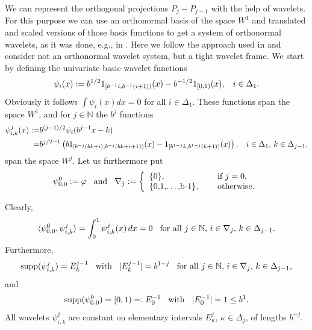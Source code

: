 \documentclass[12pt]{article}
\DeclareMathOperator{\supp}{supp}
\newcommand{\N}{\mathbb{N}}
\begin{document}
We can represent the orthogonal projections $P_j-P_{j-1}$ with the help
of wavelets. For this purpose we can use an orthonormal basis of the
space $W^1$ and translated and scaled versions of those basis functions
to get a system of orthonormal wavelets, as it was done, e.g., in
\cite{GLS07}. Here we follow the approach used in \cite{Owen97, HHY04}
and consider not an orthonormal wavelet system, but a tight
wavelet frame.
We start by defining the univariate basic wavelet functions
\begin{equation*}
\psi_i(x) := b^{1/2} 1_{[b^{-1}i, b^{-1}(i+1))}(x)
-b^{-1/2} 1_{[0,1)}(x),
\hspace{2ex}\text{$i\in\Delta_1$.}
\end{equation*}
Obviously it follows $\int \psi_i (x)dx =0$ for all $i\in\Delta_1$.
These functions span the space $W^1$, and for $j\in \N$ the $b^{j}$ functions
\begin{equation*}
\begin{split}
\psi^j_{i,k}(x) :=& b^{(j-1)/2}\psi_i(b^{j-1}x-k)\\
=& b^{j/2-1} \left( b 1_{[b^{-j}(bk+i), b^{-j}(bk+i+1))}(x)
- 1_{[b^{1-j}k, b^{1-j}(k+1))}(x) \right)
, \hspace{2ex}
\text{$i\in\Delta_1$, $k\in\Delta_{j-1}$,}
\end{split}
\end{equation*}
span the space $W^j$.
Let us furthermore put
\begin{equation*}
\psi^0_{0,0} := \varphi \hspace{2ex} \text{and}\hspace{2ex}
\nabla_j :=
\left\{\begin{array}{ll} \{0\}, & \hspace{3ex}\text{if $j=0$,}
\\ $\{0,1,\ldots,b-1\}$, & \hspace{3ex}\text{otherwise.}\end{array} \right.
\end{equation*}

Clearly, 
\begin{equation*}
\langle \psi^0_{0,0}, \psi^j_{i,k} \rangle = \int^1_0 \psi^j_{i,k}(x)\, dx = 0
\hspace{2ex}\text{for all $j\in \N$, $i\in \nabla_j$, $k\in \Delta_{j-1}$.}
\end{equation*}
Furthermore,
\begin{equation*}
\supp(\psi^j_{i,k}) = E^{j-1}_k \hspace{2ex}\text{with}\hspace{2ex} |E^{j-1}_k| = b^{1-j} 
\hspace{2ex}\text{for all $j\in \N$, $i\in \nabla_j$, $k\in \Delta_{j-1}$,}
\end{equation*}
and 
\begin{equation*}
\supp(\psi^0_{0,0}) = [0,1) =: E^{-1}_0  \hspace{2ex}\text{with}\hspace{2ex}  |E^{-1}_0| = 1 \le b^{1}.
\end{equation*}
All wavelets $\psi^j_{i,k}$ are constant on elementary intervals $E^j_{\kappa}$, $\kappa \in \Delta_{j}$, of lengths $b^{-j}$.
\end{document}
